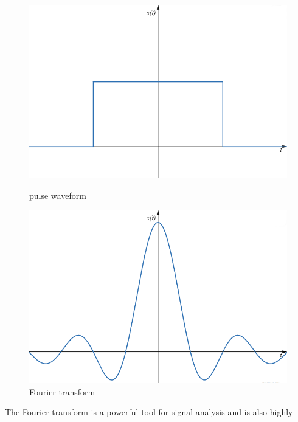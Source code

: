 \documentclass[a4paper,12pt]{article}
\begin{document}
\begin{figure}[H]
    \centering
    \begin{minipage}[b]{0.40\linewidth} %
        \centering
        \includegraphics[width=\linewidth]{pulse.png}
        \caption{pulse waveform}
        \label{fig:pulse}
    \end{minipage}
    \hspace{0.05\linewidth} %
    \begin{minipage}[b]{0.40\linewidth} %
        \centering
        \includegraphics[width=\linewidth]{f.t_pulse.png}
        \caption{Fourier transform }
        \label{fig:fourier_pulse}
    \end{minipage}
\end{figure}
The Fourier transform is a powerful tool for signal analysis and is also highly 
\end{document}
